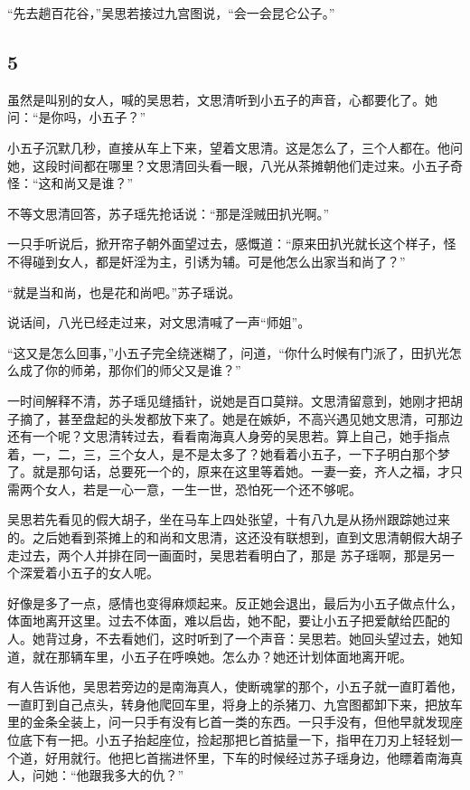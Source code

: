 “先去趟百花谷，”吴思若接过九宫图说，“会一会昆仑公子。”
\newline

{\centering\subsection{5}}

虽然是叫别的女人，喊的吴思若，文思清听到小五子的声音，心都要化了。她问：“是你吗，小五子？”

小五子沉默几秒，直接从车上下来，望着文思清。这是怎么了，三个人都在。他问她，这段时间都在哪里？文思清回头看一眼，八光从茶摊朝他们走过来。小五子奇怪：“这和尚又是谁？”

不等文思清回答，苏子瑶先抢话说：“那是淫贼田扒光啊。”

一只手听说后，掀开帘子朝外面望过去，感慨道：“原来田扒光就长这个样子，怪不得碰到女人，都是奸淫为主，引诱为辅。可是他怎么出家当和尚了？”

“就是当和尚，也是花和尚吧。”苏子瑶说。

说话间，八光已经走过来，对文思清喊了一声“师姐”。

“这又是怎么回事，”小五子完全绕迷糊了，问道，“你什么时候有门派了，田扒光怎么成了你的师弟，那你们的师父又是谁？”

一时间解释不清，苏子瑶见缝插针，说她是百口莫辩。文思清留意到，她刚才把胡子摘了，甚至盘起的头发都放下来了。她是在嫉妒，不高兴遇见她文思清，可那边还有一个呢？文思清转过去，看看南海真人身旁的吴思若。算上自己，她手指点着，一，二，三，三个女人，是不是太多了？她看着小五子，一下子明白那个梦了。就是那句话，总要死一个的，原来在这里等着她。一妻一妾，齐人之福，才只需两个女人，若是一心一意，一生一世，恐怕死一个还不够呢。

吴思若先看见的假大胡子，坐在马车上四处张望，十有八九是从扬州跟踪她过来的。之后她看到茶摊上的和尚和文思清，这还没有联想到，直到文思清朝假大胡子走过去，两个人并排在同一画面时，吴思若看明白了，那是
苏子瑶啊，那是另一个深爱着小五子的女人呢。

好像是多了一点，感情也变得麻烦起来。反正她会退出，最后为小五子做点什么，体面地离开这里。过去不体面，难以启齿，她不配，要让小五子把爱献给匹配的人。她背过身，不去看她们，这时听到了一个声音：吴思若。她回头望过去，她知道，就在那辆车里，小五子在呼唤她。怎么办？她还计划体面地离开呢。

有人告诉他，吴思若旁边的是南海真人，使断魂掌的那个，小五子就一直盯着他，一直盯到自己点头，转身他爬回车里，将身上的杀猪刀、九宫图都卸下来，把放车里的金条全装上，问一只手有没有匕首一类的东西。一只手没有，但他早就发现座位底下有一把。小五子抬起座位，捡起那把匕首掂量一下，指甲在刀刃上轻轻划一个道，好用就行。他把匕首揣进怀里，下车的时候经过苏子瑶身边，他瞟着南海真人，问她：“他跟我多大的仇？”


